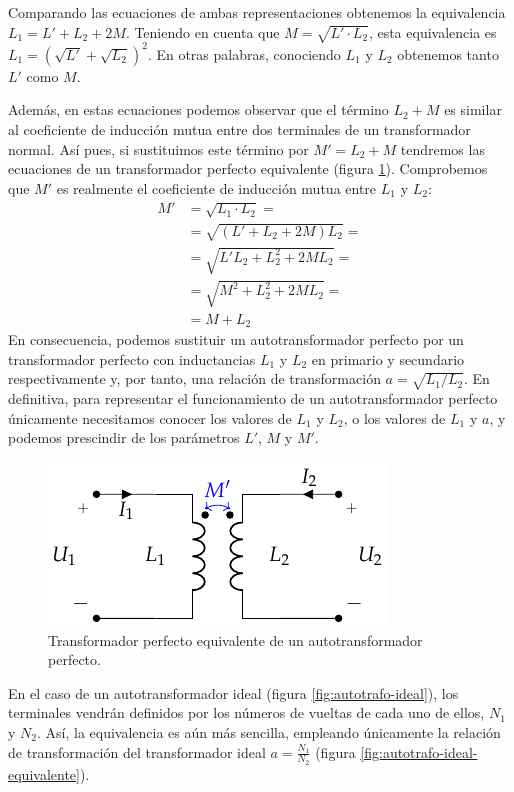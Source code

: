 Comparando las ecuaciones de ambas representaciones obtenemos la equivalencia $L_1 = L' + L_2 + 2M$. Teniendo en cuenta que $M = \sqrt{L' \cdot L_2}$, esta equivalencia es $L_1 = \left( \sqrt{L'} + \sqrt{L_2} \right)^2$. En otras palabras, conociendo $L_1$ y $L_2$ obtenemos tanto $L'$ como $M$.

Además, en estas ecuaciones podemos observar que el término $L_2 + M$ es similar al coeficiente de inducción mutua entre dos terminales de un transformador normal. Así pues, si sustituimos este término por $M' = L_2 + M$ tendremos las ecuaciones de un transformador perfecto equivalente (figura \ref{fig:autotrafo-perfecto-equivalente}). Comprobemos que $M'$ es realmente el coeficiente de inducción mutua entre $L_1$ y $L_2$:
  \begin{align*}
  M' &= \sqrt{L_1 \cdot L_2} = \\
     &= \sqrt{(L' + L_2 + 2M) L_2} =\\
     &= \sqrt{L'L_2 + L_2^2 + 2ML_2} =\\
     &= \sqrt{M^2 + L_2^2 + 2ML_2} = \\
     &= M + L_2
\end{align*}
En consecuencia, podemos sustituir un autotransformador perfecto por un transformador perfecto con inductancias $L_1$ y $L_2$ en primario y secundario respectivamente y, por tanto, una relación de transformación $a = \sqrt{L_1/L_2}$. En definitiva, para representar el funcionamiento de un autotransformador perfecto únicamente necesitamos conocer los valores de $L_1$ y $L_2$, o los valores de $L_1$ y $a$, y podemos prescindir de los parámetros $L'$, $M$ y $M'$.

\begin{figure}
  \centering
  \includegraphics[height=0.15\textheight]{../figs/AutoTrafo_TrafoPerfecto.pdf}
  \caption{Transformador perfecto equivalente de un autotransformador perfecto.}
  \label{fig:autotrafo-perfecto-equivalente}
\end{figure}

En el caso de un autotransformador ideal (figura \ref{fig:autotrafo-ideal}), los terminales vendrán definidos por los números de vueltas de cada uno de ellos, $N_1$ y $N_2$. Así, la equivalencia es aún más sencilla, empleando únicamente la relación de transformación del transformador ideal $a = \frac{N_1}{N_2}$ (figura \ref{fig:autotrafo-ideal-equivalente}).

